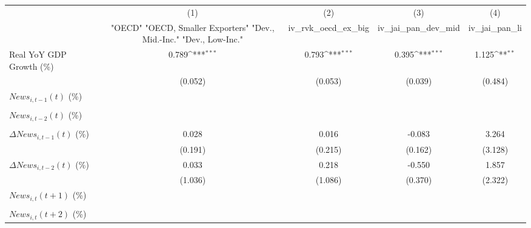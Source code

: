 {
\def\sym#1{\ifmmode^{#1}\else\(^{#1}\)\fi}
\begin{tabular}{l*{4}{c}}
\toprule
                    &\multicolumn{1}{c}{(1)}&\multicolumn{1}{c}{(2)}&\multicolumn{1}{c}{(3)}&\multicolumn{1}{c}{(4)}\\
                    &\multicolumn{1}{c}{ "OECD" "OECD, Smaller Exporters" "Dev., Mid.-Inc." "Dev., Low-Inc."}&\multicolumn{1}{c}{iv_rvk_oecd_ex_big}&\multicolumn{1}{c}{iv_jai_pan_dev_mid}&\multicolumn{1}{c}{iv_jai_pan_li}\\
\midrule
Real YoY GDP Growth (\%)&       0.789\sym{***}&       0.793\sym{***}&       0.395\sym{***}&       1.125\sym{**} \\
                    &     (0.052)         &     (0.053)         &     (0.039)         &     (0.484)         \\
\addlinespace
$ News_{i,t-1}(t)$ (\%)&                     &                     &                     &                     \\
                    &                     &                     &                     &                     \\
\addlinespace
$ News_{i,t-2}(t)$ (\%)&                     &                     &                     &                     \\
                    &                     &                     &                     &                     \\
\addlinespace
$ \Delta News_{i,t-1}(t)$ (\%)&       0.028         &       0.016         &      -0.083         &       3.264         \\
                    &     (0.191)         &     (0.215)         &     (0.162)         &     (3.128)         \\
\addlinespace
$ \Delta News_{i,t-2}(t)$ (\%)&       0.033         &       0.218         &      -0.550         &       1.857         \\
                    &     (1.036)         &     (1.086)         &     (0.370)         &     (2.322)         \\
\addlinespace
$ News_{i,t}(t+1)$ (\%)&                     &                     &                     &                     \\
                    &                     &                     &                     &                     \\
\addlinespace
$ News_{i,t}(t+2)$ (\%)&                     &                     &                     &                     \\

\end{tabular}}
